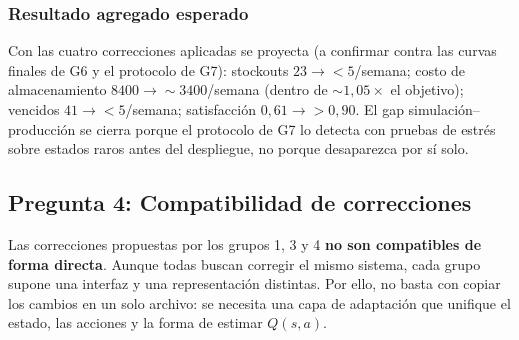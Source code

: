 \documentclass[11pt,letterpaper]{article}
\begin{document}
\subsubsection*{Resultado agregado esperado}

Con las cuatro correcciones aplicadas se proyecta (a confirmar contra las curvas
finales de G6 y el protocolo de G7): stockouts $23 \to <5$/semana; costo de
almacenamiento $\num{8400} \to \sim\num{3400}$/semana (dentro de $\sim 1{,}05\times$
el objetivo); vencidos $41 \to <5$/semana; satisfacción $0{,}61 \to >0{,}90$. El
gap simulación--producción se cierra porque el protocolo de G7 lo detecta con
pruebas de estrés sobre estados raros antes del despliegue, no porque desaparezca
por sí solo.

\vspace{4cm}

\subsection{Pregunta 4: Compatibilidad de correcciones}

Las correcciones propuestas por los grupos 1, 3 y 4 \textbf{no son compatibles de
forma directa}. Aunque todas buscan corregir el mismo sistema, cada grupo supone
una interfaz y una representación distintas. Por ello, no basta con copiar los
cambios en un solo archivo: se necesita una capa de adaptación que unifique el
estado, las acciones y la forma de estimar $Q(s,a)$.
\end{document}
